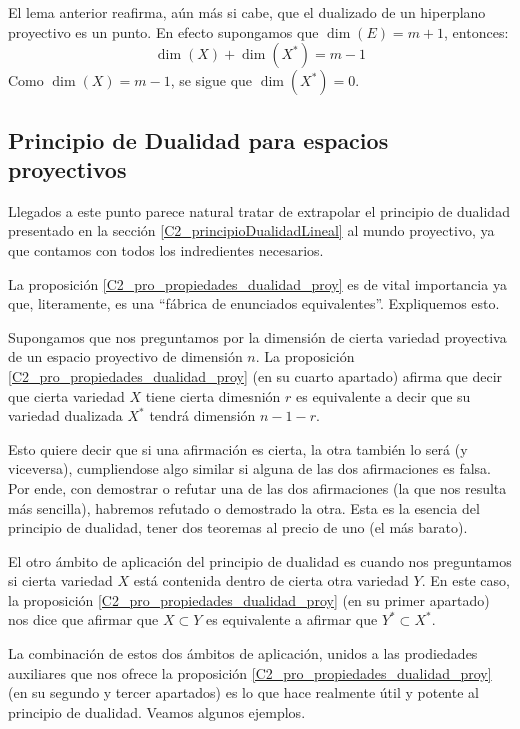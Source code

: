 \begin{obs}
	El lema anterior reafirma, aún más si cabe, que el dualizado de un hiperplano proyectivo es un punto. En efecto supongamos que $\dim(E)=m+1$, entonces:
	\begin{equation*}
	\dim(X)+\dim(X^*)=m-1
	\end{equation*}
	Como $\dim(X)=m-1$, se sigue que $\dim(X^*)=0$.
\end{obs}

\subsection{Principio de Dualidad para espacios proyectivos}
Llegados a este punto parece natural tratar de extrapolar el principio de dualidad presentado en la sección \ref{C2_principioDualidadLineal} al mundo proyectivo, ya que contamos con todos los indredientes necesarios.

La proposición \ref{C2_pro_propiedades_dualidad_proy} es de vital importancia ya que, literamente, es una ``fábrica de enunciados equivalentes''. Expliquemos esto.

Supongamos que nos preguntamos por la dimensión de cierta variedad proyectiva de un espacio proyectivo de dimensión $n$. La proposición \ref{C2_pro_propiedades_dualidad_proy} (en su cuarto apartado) afirma que decir que cierta variedad $X$ tiene cierta dimesnión $r$ es equivalente a decir que su variedad dualizada $X^*$ tendrá dimensión $n-1-r$.

Esto quiere decir que si una afirmación es cierta, la otra también lo será (y viceversa), cumpliendose algo similar si alguna de las dos afirmaciones es falsa. Por ende, con demostrar o refutar una de las dos afirmaciones (la que nos resulta más sencilla), habremos refutado o demostrado la otra. Esta es la esencia del principio de dualidad, tener dos teoremas al precio de uno (el más barato).

El otro ámbito de aplicación del principio de dualidad es cuando nos preguntamos si cierta variedad $X$ está contenida dentro de cierta otra variedad $Y$. En este caso, la proposición \ref{C2_pro_propiedades_dualidad_proy} (en su primer apartado) nos dice que afirmar que $X\subset Y$ es equivalente a afirmar que $Y^*\subset X^*$.

La combinación de estos dos ámbitos de aplicación, unidos a las prodiedades auxiliares que nos ofrece la proposición \ref{C2_pro_propiedades_dualidad_proy} (en su segundo y tercer apartados) es lo que hace  realmente útil y potente al principio de dualidad. Veamos algunos ejemplos.

